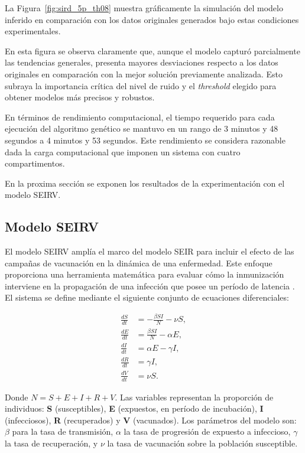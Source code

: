 La Figura~\ref{fig:sird_5p_th08} muestra gráficamente la simulación del modelo inferido en comparación con los datos originales generados bajo estas condiciones experimentales.

En esta figura se observa claramente que, aunque el modelo capturó parcialmente las tendencias generales, presenta mayores desviaciones respecto a los datos originales en comparación con la mejor solución previamente analizada. Esto subraya la importancia crítica del nivel de ruido y el \textit{threshold} elegido para obtener modelos más precisos y robustos.

En términos de rendimiento computacional, el tiempo requerido para cada ejecución del algoritmo genético se mantuvo en un rango de 3 minutos y 48 segundos a 4 minutos y 53 segundos. Este rendimiento se considera razonable dada la carga computacional que imponen un sistema con cuatro compartimentos.

En la proxima secci\'on se exponen los resultados de la experimentaci\'on con el modelo SEIRV.

\subsection{Modelo SEIRV}

El modelo SEIRV amplía el marco del modelo SEIR para incluir el efecto de las campañas de vacunación en la dinámica de una enfermedad. Este enfoque proporciona una herramienta matemática para evaluar cómo la inmunización interviene en la propagación de una infección que posee un período de latencia \cite{Anderson1991}. El sistema se define mediante el siguiente conjunto de ecuaciones diferenciales:

\[
\begin{aligned}
    \frac{dS}{dt} &= -\frac{\beta SI}{N} - \nu S, \\
    \frac{dE}{dt} &= \frac{\beta SI}{N} - \alpha E, \\
    \frac{dI}{dt} &= \alpha E - \gamma I, \\
    \frac{dR}{dt} &= \gamma I, \\
    \frac{dV}{dt} &= \nu S.
\end{aligned}
\]

Donde $N = S+E+I+R+V$. Las variables representan la proporción de individuos: \textbf{S} (susceptibles), \textbf{E} (expuestos, en período de incubación), \textbf{I} (infecciosos), \textbf{R} (recuperados) y \textbf{V} (vacunados). Los parámetros del modelo son: $\beta$ para la tasa de transmisión, $\alpha$ la tasa de progresión de expuesto a infeccioso, $\gamma$ la tasa de recuperación, y $\nu$ la tasa de vacunación sobre la población susceptible.


